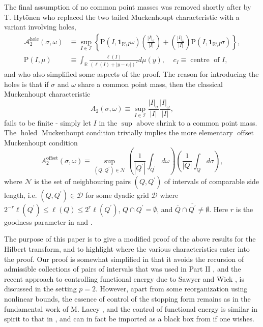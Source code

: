 \documentclass{amsart}%
\theoremstyle{plain}
\numberwithin{equation}{section}
\begin{document}
The final assumption of no common point masses was removed shortly after by T.
Hyt\"{o}nen \cite{Hyt2} who replaced the two tailed Muckenhoupt characteristic
with a variant involving holes,%
\begin{align*}
\mathcal{A}_{2}^{\operatorname{hole}}\left(  \sigma,\omega\right)   &
\equiv\sup_{I\in\mathcal{I}}\left\{  \mathrm{P}\left(  I,\mathbf{1}%
_{\mathbb{R}\setminus I}\omega\right)  \left(  \frac{\left\vert I\right\vert
_{\sigma}}{\left\vert I\right\vert }\right)  +\left(  \frac{\left\vert
I\right\vert _{\omega}}{\left\vert I\right\vert }\right)  \mathrm{P}\left(
I,\mathbf{1}_{\mathbb{R}\setminus I}\sigma\right)  \right\}  ,\\
\mathrm{P}\left(  I,\mu\right)   & \equiv\int_{\mathbb{R}}\frac{\ell\left(
I\right)  }{\left(  \ell\left(  I\right)  +\left\vert y-c_{I}\right\vert
\right)  ^{2}}d\mu\left(  y\right)  ,\ \ \ \ \ c_{I}\equiv
\operatorname*{centre}\text{ of }I,
\end{align*}
and who also simplified some aspects of the proof. The reason for introducing
the holes is that if $\sigma$ and $\omega$ share a common point mass, then the
classical Muckenhoupt characteristic%
\[
A_{2}\left(  \sigma,\omega\right)  \equiv\sup_{I\in\mathcal{I}}\frac
{\left\vert I\right\vert _{\sigma}}{\left\vert I\right\vert }\frac{\left\vert
I\right\vert _{\omega}}{\left\vert I\right\vert },
\]
fails to be finite - simply let $I$ in the $\sup$ above shrink to a common
point mass. The $\operatorname{holed}$ Muckenhoupt condition trivially implies
the more elementary $\operatorname*{offset}$ Muckenhoupt condition
\[
A_{2}^{\operatorname*{offset}}\left(  \sigma,\omega\right)  \equiv
\sup_{\left(  Q,Q^{\prime}\right)  \in\mathcal{N}}\left(  \frac{1}{\left\vert
Q^{\prime}\right\vert }\int_{Q^{\prime}}d\omega\right)  \left(  \frac
{1}{\left\vert Q\right\vert }\int_{Q}d\sigma\right)  ,
\]
where $\mathcal{N}$ is the set of neighbouring pairs $\left(  Q,Q^{\prime
}\right)  $ of intervals of comparable side length, i.e. $\left(  Q,Q^{\prime
}\right)  \in\mathcal{D}$ for some dyadic grid $\mathcal{D}$ where $2^{-r}%
\ell\left(  Q^{\prime}\right)  \leq\ell\left(  Q\right)  \leq2^{r}\ell\left(
Q^{\prime}\right)  $, $Q\cap Q^{\prime}=\emptyset$, and $\overline{Q}%
\cap\overline{Q^{\prime}}\not =\emptyset$. Here $r$ is the goodness parameter
in \cite{NTV3} and \cite{LaSaShUr3}.

The purpose of this paper is to give a modified proof of the above results for
the Hilbert transform, and to highlight where the various characteristics
enter into the proof. Our proof is somewhat simplified in that it avoids the
recursion of admissible collections of pairs of intervals that was used in
Part II \cite{Lac}, and the recent approach to controlling functional energy
due to Sawyer and Wick \cite{SaWi}, is discussed in the setting $p=2$.
However, apart from some reorganization using nonlinear bounds, the essence of
control of the stopping form remains as in the fundamental work of M. Lacey
\cite{Lac}, and the control of functional energy is similar in spirit to that
in \cite{LaSaShUr3}, and can in fact be imported as a black box from
\cite{LaSaShUr3} if one wishes.
\end{document}
